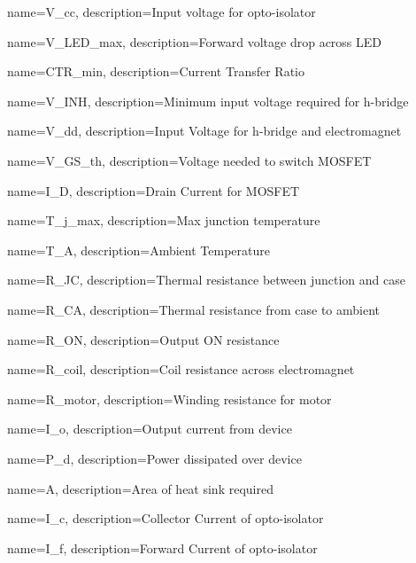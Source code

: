 {
    name=V_{cc},
    description={Input voltage for opto-isolator}
}
 
{
    name=V_{LED_{max}},
    description={Forward voltage drop across LED}
}

{
    name=CTR_{min},
    description={Current Transfer Ratio}
}

{
    name=V_{INH},
    description={Minimum input voltage required for h-bridge}
}

{
    name=V_{dd},
    description={Input Voltage for h-bridge and electromagnet}
}

{
    name=V_{GS_{th}},
    description={Voltage needed to switch MOSFET}
}

{
    name=I_{D},
    description={Drain Current for MOSFET}
}

{
    name=T_{j_{max}},
    description={Max junction temperature}
}

{
    name=T_{A},
    description={Ambient Temperature}
}

{
    name=R_{JC},
    description={Thermal resistance between junction and case}
}

{
    name=R_{CA},
    description={Thermal resistance from case to ambient}
}

{
    name=R_{ON},
    description={Output ON resistance}
}

{
    name=R_{coil},
    description={Coil resistance across electromagnet}
}

{
    name=R_{motor},
    description={Winding resistance for motor}
}

{
    name=I_{o},
    description={Output current from device}
}

{
    name=P_{d},
    description={Power dissipated over device}
}

{
    name=A,
    description={Area of heat sink required}
}

{
    name=I_c,
    description={Collector Current of opto-isolator}
}

{
    name=I_f,
    description={Forward Current of opto-isolator}
}